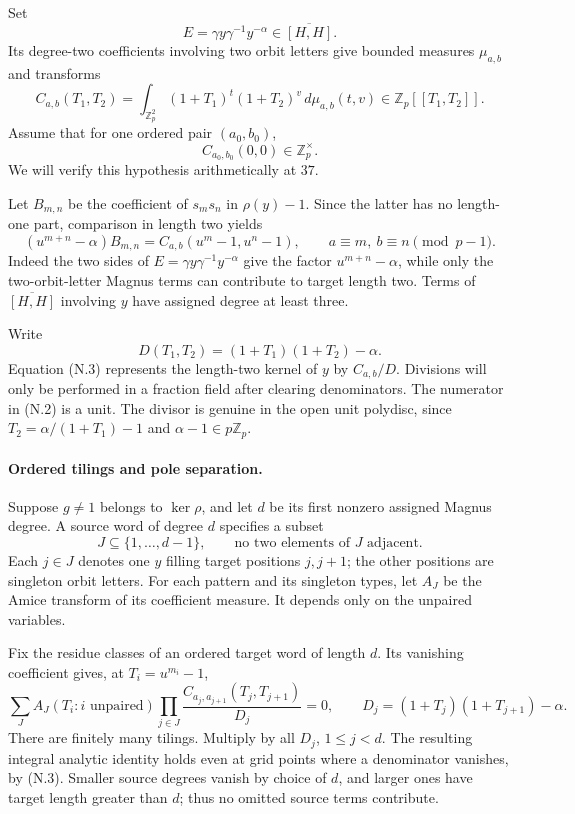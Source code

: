 Set
\[
 E=\gamma y\gamma^{-1}y^{-\alpha}\in\overline{[H,H]}.
\]
Its degree-two coefficients involving two orbit letters give bounded measures $\mu_{a,b}$ and transforms
\[
 C_{a,b}(T_1,T_2)=
 \int_{\mathbb Z_p^2}(1+T_1)^t(1+T_2)^v\,d\mu_{a,b}(t,v)
 \in\mathbb Z_p[[T_1,T_2]].
\]
Assume that for one ordered pair $(a_0,b_0)$,
\[
 C_{a_0,b_0}(0,0)\in\mathbb Z_p^\times.                         \tag{N.2}
\]
We will verify this hypothesis arithmetically at $37$.

Let $B_{m,n}$ be the coefficient of $s_ms_n$ in $\rho(y)-1$. Since the latter has no length-one part, comparison in length two yields
\[
 (u^{m+n}-\alpha)B_{m,n}
   =C_{a,b}(u^m-1,u^n-1),\qquad a\equiv m,\ b\equiv n\pmod{p-1}.
                                                                    \tag{N.3}
\]
Indeed the two sides of $E=\gamma y\gamma^{-1}y^{-\alpha}$ give the factor $u^{m+n}-\alpha$, while only the two-orbit-letter Magnus terms can contribute to target length two. Terms of $\overline{[H,H]}$ involving $y$ have assigned degree at least three.

Write
\[
 D(T_1,T_2)=(1+T_1)(1+T_2)-\alpha.
\]
Equation (N.3) represents the length-two kernel of $y$ by $C_{a,b}/D$. Divisions will only be performed in a fraction field after clearing denominators. The numerator in (N.2) is a unit. The divisor is genuine in the open unit polydisc, since $T_2=\alpha/(1+T_1)-1$ and $\alpha-1\in p\mathbb Z_p$.

\paragraph{Ordered tilings and pole separation.}
Suppose $g\ne1$ belongs to $\ker\rho$, and let $d$ be its first nonzero assigned Magnus degree. A source word of degree $d$ specifies a subset
\[
 J\subseteq\{1,\ldots,d-1\},\qquad
 \text{no two elements of }J\text{ adjacent}.
\]
Each $j\in J$ denotes one $y$ filling target positions $j,j+1$; the other positions are singleton orbit letters. For each pattern and its singleton types, let $A_J$ be the Amice transform of its coefficient measure. It depends only on the unpaired variables.

Fix the residue classes of an ordered target word of length $d$. Its vanishing coefficient gives, at $T_i=u^{m_i}-1$,
\[
 \sum_J A_J(T_i:i\text{ unpaired})
       \prod_{j\in J}
       \frac{C_{a_j,a_{j+1}}(T_j,T_{j+1})}{D_j}=0,
 \qquad D_j=(1+T_j)(1+T_{j+1})-\alpha.                         \tag{N.4}
\]
There are finitely many tilings. Multiply by all $D_j$, $1\le j<d$. The resulting integral analytic identity holds even at grid points where a denominator vanishes, by (N.3). Smaller source degrees vanish by choice of $d$, and larger ones have target length greater than $d$; thus no omitted source terms contribute.

